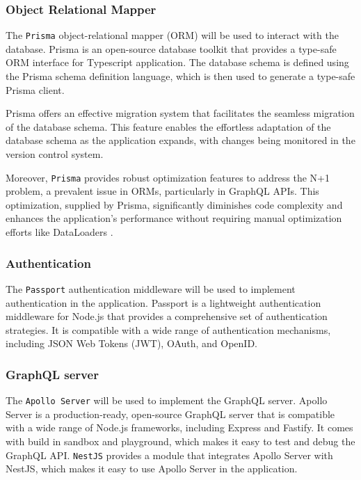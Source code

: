 \documentclass[../main.tex]{subfiles}
\begin{document}
\subsubsection{Object Relational Mapper}

The \texttt{Prisma} \cite{prisma} object-relational mapper (ORM) will be used to interact with the database.
Prisma is an open-source database toolkit that provides a type-safe ORM interface for Typescript application.
The database schema is defined using the Prisma schema definition language, which is then used to generate a type-safe Prisma client.

Prisma offers an effective migration system that facilitates the seamless migration of the database schema.
This feature enables the effortless adaptation of the database schema as the application expands, with changes being monitored in the version control system.

Moreover, \texttt{Prisma} provides robust optimization features \cite{prisma_optimization} to address the N+1 problem, a prevalent issue in ORMs, particularly in GraphQL APIs.
This optimization, supplied by Prisma, significantly diminishes code complexity and enhances the application's performance without requiring manual optimization efforts like DataLoaders \cite{medium_dataloaders_graphql}.

\subsubsection{Authentication}

The \texttt{Passport} \cite{passport} authentication middleware will be used to implement authentication in the application.
Passport is a lightweight authentication middleware for Node.js that provides a comprehensive set of authentication strategies.
It is compatible with a wide range of authentication mechanisms, including JSON Web Tokens (JWT), OAuth, and OpenID.

\subsubsection{GraphQL server}

The \texttt{Apollo Server} \cite{apollo_server} will be used to implement the GraphQL server.
Apollo Server is a production-ready, open-source GraphQL server that is compatible with a wide range of Node.js frameworks, including Express and Fastify.
It comes with build in sandbox and playground, which makes it easy to test and debug the GraphQL API.
\texttt{NestJS} provides a module that integrates Apollo Server with NestJS, which makes it easy to use Apollo Server in the application.
\end{document}
